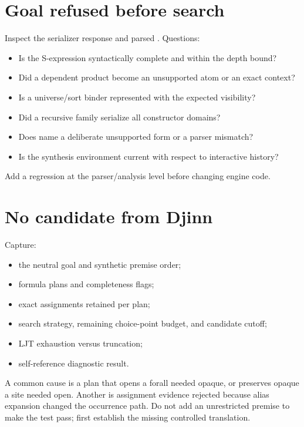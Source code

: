 \documentclass[10pt,letterpaper,oneside]{report}
\newcommand{\code}[1]{\texttt{\detokenize{#1}}}
\begin{document}
\section{Goal refused before search}

Inspect the serializer response and parsed \code{Frag}. Questions:

\begin{itemize}
  \item Is the S-expression syntactically complete and within the depth bound?
  \item Did a dependent product become an unsupported atom or an exact context?
  \item Is a universe/sort binder represented with the expected visibility?
  \item Did a recursive family serialize all constructor domains?
  \item Does \code{fragRefusal} name a deliberate unsupported form or a parser mismatch?
  \item Is the synthesis environment current with respect to interactive history?
\end{itemize}

Add a regression at the \code{Fragment} parser/analysis level before changing engine code.

\section{No candidate from Djinn}

Capture:

\begin{itemize}
  \item the neutral goal and synthetic premise order;
  \item formula plans and completeness flags;
  \item exact assignments retained per plan;
  \item search strategy, remaining choice-point budget, and candidate cutoff;
  \item LJT exhaustion versus truncation;
  \item self-reference diagnostic result.
\end{itemize}

A common cause is a plan that opens a forall needed opaque, or preserves opaque a site needed open. Another is assignment evidence rejected because alias expansion changed the occurrence path. Do not add an unrestricted premise to make the test pass; first establish the missing controlled translation.
\end{document}
